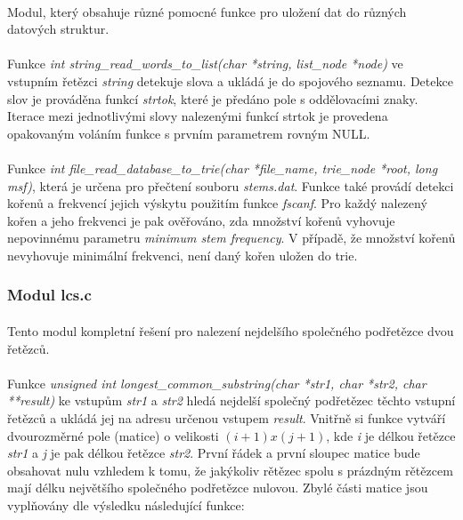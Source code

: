 ﻿\documentclass[12pt, a4paper]{article}
\begin{document}
\paragraph{}
Modul, který obsahuje různé pomocné funkce pro uložení dat do různých datových struktur.

\paragraph{}
Funkce \textit{int string\_read\_words\_to\_list(char *string, list\_node *node)} ve vstupním řetězci \textit{string} detekuje slova a ukládá je do spojového seznamu. Detekce slov je prováděna funkcí \textit{strtok}, které je předáno pole s oddělovacími znaky. Iterace mezi jednotlivými slovy nalezenými funkcí strtok je provedena opakovaným voláním funkce s prvním parametrem rovným NULL. 

\paragraph{}
Funkce \textit{int file\_read\_database\_to\_trie(char *file\_name, trie\_node *root, long msf)}, která je určena pro přečtení souboru \textit{stems.dat}. Funkce také provádí detekci kořenů a frekvencí jejich výskytu použitím funkce \textit{fscanf}. Pro každý nalezený kořen a jeho frekvenci je pak ověřováno, zda množství kořenů vyhovuje nepovinnému parametru \textit{minimum stem frequency}. V případě, že množství kořenů nevyhovuje minimální frekvenci, není daný kořen uložen do trie. 

\subsubsection{Modul lcs.c}
\paragraph{}
Tento modul kompletní řešení pro nalezení nejdelšího společného podřetězce dvou řetězců.

\paragraph{}
Funkce \textit{unsigned int longest\_common\_substring(char *str1, char *str2, char **result)} ke vstupům \textit{str1} a \textit{str2} hledá nejdelší společný podřetězec těchto vstupní řetězců a ukládá jej na adresu určenou vstupem \textit{result}. Vnitřně si funkce vytváří dvourozměrné pole (matice) o velikosti $(i + 1) x (j + 1)$, kde \textit{i} je délkou řetězce \textit{str1} a \textit{j} je pak délkou řetězce \textit{str2}. První řádek a první sloupec matice bude obsahovat nulu vzhledem k tomu, že jakýkoliv rětězec spolu s prázdným rětězcem mají délku největšího společného podřetězce nulovou. Zbylé části matice jsou vyplňovány dle výsledku následující funkce:
\end{document}
